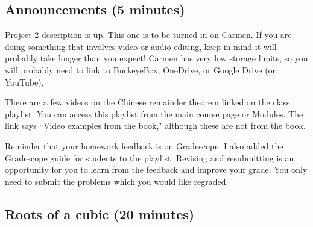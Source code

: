 \documentclass[letterpaper, 11 pt]{article}
\begin{document}
\subsection{Announcements (5 minutes)}
Project 2 description is up. This one is to be turned in on Carmen. If you are doing something that involves video or audio editing, keep in mind it will probably take longer than you expect! Carmen has very low storage limits, so you will probably need to link to BuckeyeBox, OneDrive, or Google Drive (or YouTube).

There are a few videos on the Chinese remainder theorem linked on the class playlist. You can access this playlist from the main course page or Modules. The link says ``Video examples from the book," although these are not from the book.

Reminder that your homework feedback is on Gradescope. I also added the Gradescope guide for students to the playlist. Revising and resubmitting is an opportunity for you to learn from the feedback and improve your grade. You only need to submit the problems which you would like regraded.

\subsection{Roots of a cubic (20 minutes)}
\end{document}
